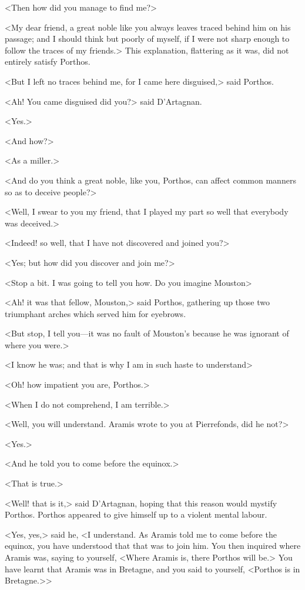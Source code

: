 <Then how did you manage to find me?>

<My dear friend, a great noble like you always leaves traced behind him on his passage; and I should think but poorly of myself, if I were not sharp enough to follow the traces of my friends.> This explanation, flattering as it was, did not entirely satisfy Porthos.

<But I left no traces behind me, for I came here disguised,> said Porthos.

<Ah! You came disguised did you?> said D'Artagnan.

<Yes.>

<And how?>

<As a miller.>

<And do you think a great noble, like you, Porthos, can affect common manners so as to deceive people?>

<Well, I swear to you my friend, that I played my part so well that everybody was deceived.>

<Indeed! so well, that I have not discovered and joined you?>

<Yes; but how did you discover and join me?>

<Stop a bit. I was going to tell you how. Do you imagine Mouston\longdash>

<Ah! it was that fellow, Mouston,> said Porthos, gathering up those two triumphant arches which served him for eyebrows.

<But stop, I tell you—it was no fault of Mouston's because he was ignorant of where you were.>

<I know he was; and that is why I am in such haste to understand\longdash>

<Oh! how impatient you are, Porthos.>

<When I do not comprehend, I am terrible.>

<Well, you will understand. Aramis wrote to you at Pierrefonds, did he not?>

<Yes.>

<And he told you to come before the equinox.>

<That is true.>

<Well! that is it,> said D'Artagnan, hoping that this reason would mystify Porthos. Porthos appeared to give himself up to a violent mental labour.

<Yes, yes,> said he, <I understand. As Aramis told me to come before the equinox, you have understood that that was to join him. You then inquired where Aramis was, saying to yourself, <Where Aramis is, there Porthos will be.> You have learnt that Aramis was in Bretagne, and you said to yourself, <Porthos is in Bretagne.>>

